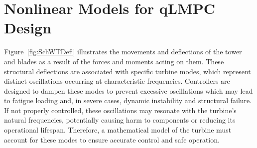 \section{Nonlinear Models for qLMPC Design} \label{sec:MechanicalAerodynamicSubsystemModel}
Figure~\ref{fig:SchWTDefl} illustrates the movements and deflections of the tower and blades as a result of the forces and moments acting on them.
These structural deflections are associated with specific turbine modes, which represent distinct oscillations occurring at characteristic frequencies. Controllers are designed to dampen these modes to prevent excessive oscillations which may lead to fatigue loading and, in severe cases, dynamic instability and structural failure. If not properly controlled, these oscillations may resonate with the turbine’s natural frequencies, potentially causing harm to components or reducing its operational lifespan. Therefore, a mathematical model of the turbine must account for these modes to ensure accurate control and safe operation. 

